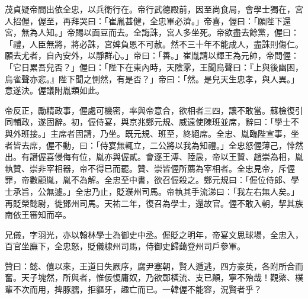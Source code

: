 \begin{pinyinscope}
 茂貞疑帝間出依全忠，以兵衛行在。帝行武德殿前，因至尚食局，會學士獨在，宮人招偓，偓至，再拜哭曰：「崔胤甚健，全忠軍必濟。」帝喜，偓曰：「願陛下還宮，無為人知。」帝賜以面豆而去。全誨誅，宮人多坐死。帝欲盡去餘黨，偓曰：「禮，人臣無將，將必誅，宮婢負恩不可赦。然不三十年不能成人，盡誅則傷仁。願去尤者，自內安外，以靜群心。」帝曰：「善。」崔胤請以輝王為元帥，帝問偓：「它日累吾兒否？」偓曰：「陛下在東內時，天陰雺，王聞烏聲曰：『上與後幽困，烏雀聲亦悲。』陛下聞之惻然，有是否？」帝曰：「然。是兒天生忠孝，與人異。」意遂決。偓議附胤類如此。



 帝反正，勵精政事，偓處可機密，率與帝意合，欲相者三四，讓不敢當。蘇檢復引同輔政，遂固辭。初，偓侍宴，與京兆鄭元規、威遠使陳班並席，辭曰：「學士不與外班接。」主席者固請，乃坐。既元規、班至，終絕席。全忠、胤臨陛宣事，坐者皆去席，偓不動，曰：「侍宴無輒立，二公將以我為知禮。」全忠怒偓薄己，悻然出。有譖偓喜侵侮有位，胤亦與偓貳。會逐王溥、陸扆，帝以王贊、趙崇為相，胤執贊、崇非宰相器，帝不得已而罷。贊、崇皆偓所薦為宰相者。全忠見帝，斥偓罪，帝數顧胤，胤不為解。全忠至中書，欲召偓殺之。鄭元規曰：「偓位侍郎、學士承旨，公無遽。」全忠乃止，貶濮州司馬。帝執其手流涕曰：「我左右無人矣。」再貶榮懿尉，徙鄧州司馬。天祐二年，復召為學士，還故官。偓不敢入朝，挈其族南依王審知而卒。



 兄儀，字羽光，亦以翰林學士為御史中丞。偓貶之明年，帝宴文思球場，全忠入，百官坐廡下，全忠怒，貶儀棣州司馬，侍御史歸藹登州司戶參軍。



 贊曰：懿、僖以來，王道日失厥序，腐尹塞朝，賢人遁逃，四方豪英，各附所合而奮。天子塊然，所與者，惟佞愎庸奴，乃欲鄣橫流、支已顛，寧不殆哉！觀綮、樸輩不次而用，捭豚臑，拒貙牙，趣亡而已。一韓偓不能容，況賢者乎？



\end{pinyinscope}